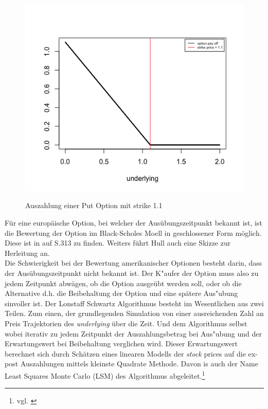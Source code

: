 \documentclass[10pt,a4paper]{article}
\begin{document}
\begin{figure}[H]
  \centering
  \includegraphics[scale=0.7]{PlotOption.png}
  \label{fig:PlotOption}
  \caption{Auszahlung einer Put Option mit strike 1.1}
\end{figure}

Für eine europäische Option, bei welcher der Ausübungszeitpunkt bekannt ist, ist die Bewertung der Option im Black-Scholes Moell in geschlossener Form möglich. Diese ist in \cite{Hull} auf S.313 zu finden. Weiters führt Hull auch eine Skizze zur Herleitung an.\\
Die Schwierigkeit bei der Bewertung amerikanischer Optionen besteht darin, dass der Ausübungszeitpunkt nicht bekannt ist. Der K"aufer der Option muss also zu jedem Zeitpunkt abwägen, ob die Option ausgeübt werden soll, oder ob die Alternative d.h. die Beibehaltung der Option und eine spätere Aus"ubung sinvoller ist. 
Der Lonstaff Schwartz Algorithmus besteht im Wesentlichen aus zwei Teilen. Zum einen, der grundlegenden Simulation von einer ausreichenden Zahl an Preis Trajektorien des \textit{underlying} über die Zeit. Und dem Algorithmus selbst wobei iterativ zu jedem Zeitpunkt der Auszahlungsbetrag bei Aus"ubung und der Erwartungswert bei Beibehaltung verglichen wird. Dieser Erwartungswert berechnet sich durch Schätzen eines linearen Modells der \textit{stock} prices auf die ex-post Auszahlungen mittels kleinste Quadrate Methode. Davon is auch der Name  Least Squares Monte Carlo (LSM) des Algorithmus abgeleitet.\footnote{vgl. \cite[S.114]{schwartz2001}} 
\end{document}
